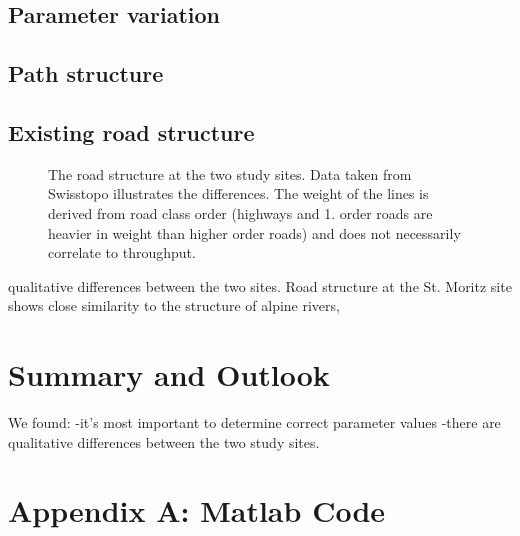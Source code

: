 \documentclass[a4paper, DIV11, abstracton]{scrartcl}
\begin{document}
\subsection{Parameter variation}


\subsection{Path structure}


\subsection{Existing road structure}

\begin{figure}[tbp]
	\caption{The road structure at the two study sites. Data taken from Swisstopo illustrates the differences. The weight of the lines is derived from road class order (highways and 1. order roads are heavier in weight than higher order roads) and does not necessarily correlate to throughput.}
	\label{fig:roads}
\end{figure}

qualitative differences between the two sites. Road structure at the St. Moritz site shows close similarity to the structure of alpine rivers, 




\section{Summary and Outlook}
We found:
-it's most important to determine correct parameter values
-there are qualitative differences between the two study sites.





\newpage
\section{Appendix A: Matlab Code}
\end{document}
